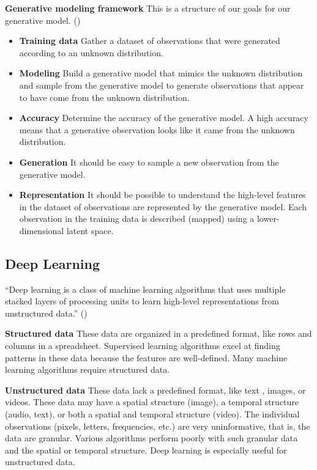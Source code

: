 \documentclass[10pt, letterpaper, twoside]{article}
\begin{document}
\textbf{Generative modeling framework} This is a structure of our goals for our generative model. (\cite[10-11]{foster_david_2023})
\begin{itemize}
    \item{\textbf{Training data} Gather a dataset of observations that were generated according to an unknown distribution.}
    \item{\textbf{Modeling} Build a generative model that mimics the unknown distribution and sample from the generative model to generate observations that appear to have come from the unknown distribution.}
    \item{\textbf{Accuracy} Determine the accuracy of the generative model. A high accuracy means that a generative observation looks like it came from the unknown distribution.}
    \item{\textbf{Generation} It should be easy to sample a new observation from the generative model.}
    \item{\textbf{Representation} It should be possible to understand the high-level features in the dataset of observations are represented by the generative model. Each observation in the training data is described (mapped) using a lower-dimensional latent space.}
\end{itemize}

\subsection{Deep Learning}\label{sec:deep_learning}
\enquote{Deep learning is a class of machine learning algorithms that uses multiple stacked layers of processing units to learn high-level representations from unstructured data.} (\cite[23]{foster_david_2023})

\textbf{Structured data} These data are organized in a predefined format, like rows and columns in a spreadsheet.  Supervised learning algorithms excel at finding patterns in these data because the features are well-defined. Many machine learning algorithms require structured data.

\textbf{Unstructured data} These data lack a predefined format,  like text , images, or videos. These data may have a spatial structure (image), a temporal structure (audio, text), or both a spatial and temporal structure (video). The individual observations (pixels, letters, frequencies, etc.) are very uninformative, that is, the data are granular. Various algorithms perform poorly with such granular data and the spatial or temporal structure. Deep learning is especially useful for unstructured data.
\end{document}
